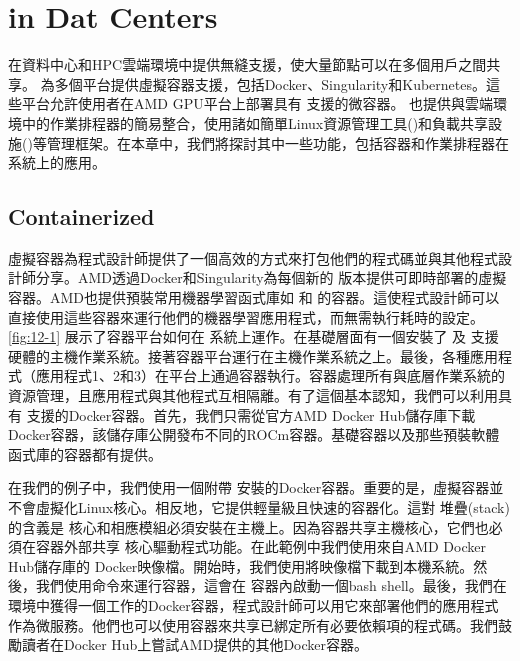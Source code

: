 \chapter{ in Dat Centers}

 在資料中心和HPC雲端環境中提供無縫支援，使大量節點可以在多個用戶之間共享。 為多個平台提供虛擬容器支援，包括Docker、Singularity和Kubernetes。這些平台允許使用者在AMD GPU平台上部署具有  支援的微容器。 也提供與雲端環境中的作業排程器的簡易整合，使用諸如簡單Linux資源管理工具()和負載共享設施()等管理框架。在本章中，我們將探討其中一些功能，包括容器和作業排程器在  系統上的應用。

\section{Containerized }

 虛擬容器為程式設計師提供了一個高效的方式來打包他們的程式碼並與其他程式設計師分享。AMD透過Docker和Singularity為每個新的  版本提供可即時部署的虛擬容器。AMD也提供預裝常用機器學習函式庫如  和  的容器。這使程式設計師可以直接使用這些容器來運行他們的機器學習應用程式，而無需執行耗時的設定。\autoref{fig:12-1} 展示了容器平台如何在  系統上運作。在基礎層面有一個安裝了  及  支援硬體的主機作業系統。接著容器平台運行在主機作業系統之上。最後，各種應用程式（應用程式1、2和3）在平台上通過容器執行。容器處理所有與底層作業系統的資源管理，且應用程式與其他程式互相隔離。有了這個基本認知，我們可以利用具有  支援的Docker容器。首先，我們只需從官方AMD Docker Hub儲存庫下載Docker容器，該儲存庫公開發布不同的ROCm容器。基礎容器以及那些預裝軟體函式庫的容器都有提供。

在我們的例子中，我們使用一個附帶  安裝的Docker容器。重要的是，虛擬容器並不會虛擬化Linux核心。相反地，它提供輕量級且快速的容器化。這對  堆疊(stack)的含義是  核心和相應模組必須安裝在主機上。因為容器共享主機核心，它們也必須在容器外部共享  核心驅動程式功能。在此範例中我們使用來自AMD Docker Hub儲存庫的  Docker映像檔。開始時，我們使用將映像檔下載到本機系統。然後，我們使用命令來運行容器，這會在 容器內啟動一個bash shell。最後，我們在  環境中獲得一個工作的Docker容器，程式設計師可以用它來部署他們的應用程式作為微服務。他們也可以使用容器來共享已綁定所有必要依賴項的程式碼。我們鼓勵讀者在Docker Hub上嘗試AMD提供的其他Docker容器。

